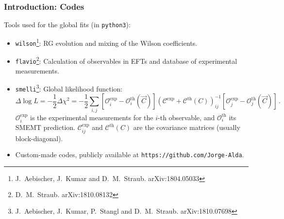 \documentclass[mathserif, 10pt]{beamer}
\begin{document}
\begin{frame}\frametitle{Introduction: Codes}
    Tools used for the global fits (in \texttt{python3}):
    \begin{itemize}
        \item \texttt{wilson}\footnote[4]{J.~Aebischer, J.~Kumar and D.~M.~Straub. arXiv:1804.05033}: RG evolution and mixing of the Wilson coefficients.
        \item \texttt{flavio}\footnote[5]{D.~M.~Straub. arXiv:1810.08132}: Calculation of observables in EFTs and database of experimental measurements.
        \item \texttt{smelli}\footnote[6]{J.~Aebischer, J.~Kumar, P.~Stangl and D.~M.~Straub. arXiv:1810.07698}: Global likelihood function:
              {\small$$\Delta \log L = -\frac{1}{2}\Delta\chi^2 = -\frac{1}{2}\sum_{i,j} [\mathcal{O}_i^\mathrm{exp} - \mathcal{O}^\mathrm{th}_i(\vec{C})] (\mathcal{C}^\mathrm{exp}+\mathcal{C}^\mathrm{th}(C))^{-1}_{ij} [\mathcal{O}_j^\mathrm{exp} - \mathcal{O}^\mathrm{th}_j(\vec{C})]\,. $$} %
              $\mathcal{O}_i^\mathrm{exp}$ is the experimental measurements for the $i$-th observable, and $\mathcal{O}_i^\mathrm{th}$ its SMEMT prediction. $\mathcal{C}_{ij}^\mathrm{exp}$ and $\mathcal{C}^\mathrm{th}(C)$ are the covariance matrices (usually block-diagonal).%
        \item Custom-made codes, publicly available at \texttt{https://github.com/Jorge-Alda}.
    \end{itemize}
\end{frame}
\end{document}
